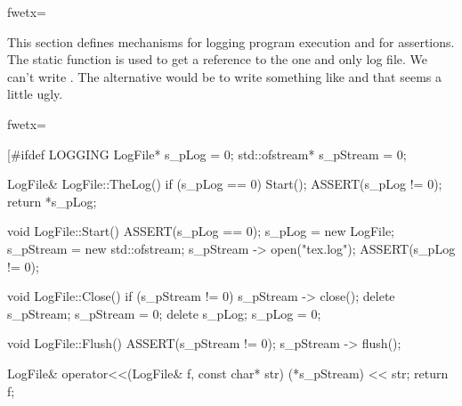 \fwbeginmacro
{}\fwplusequals \fwodef {}fwetx=%
\fwcdef 
\fwbeginmacronotes
{}
\fwendmacronotes
\fwendmacro







This section defines mechanisms for logging program execution and for
assertions. The static function  is used to get a reference
to the one and only log file. We can't write . The
alternative would be to write something like
 and that seems a little ugly.

\fwbeginmacro
{}\fwequals \fwodef {}fwetx=%
\fwcdef 
\fwbeginmacronotes
{}
\fwendmacronotes
\fwendmacro


\fwbeginmacro
{}\fwequals \fwodef \fwbtx[#ifdef LOGGING
   LogFile* s_pLog = 0;
   std::ofstream* s_pStream = 0;

   LogFile& LogFile::TheLog()
   {
      if (s_pLog == 0){
        Start();
      }
      ASSERT(s_pLog != 0);
      return *s_pLog;
   }

   void LogFile::Start()
   {
     ASSERT(s_pLog == 0);
     s_pLog = new LogFile;
     s_pStream = new std::ofstream;
     s_pStream -> open("tex.log");
     ASSERT(s_pLog != 0);
   }

   void LogFile::Close()
   {
      if (s_pStream != 0){
          s_pStream -> close();
          delete s_pStream;
          s_pStream = 0;
      }
      delete s_pLog;
      s_pLog = 0;
   }

   void LogFile::Flush()
   {
      ASSERT(s_pStream != 0);
      s_pStream -> flush();
   }

   LogFile& operator<<(LogFile& f, const char* str)
   {
      (*s_pStream) << str;
      return f;
   }

